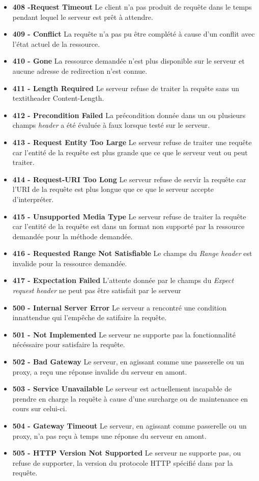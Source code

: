 \documentclass{scrreprt}
\begin{document}
\begin{itemize}
 \item \textbf{408 -Request Timeout}
 \subitem Le client n'a pas produit de requête dans le temps pendant lequel le serveur est prêt à attendre.
 \item \textbf{409 - Conflict}
 \subitem La requête n'a pas pu être complété à cause d'un conflit avec l'état actuel de la ressource.
 \item \textbf{410 - Gone}
 \subitem La ressource demandée n'est plus disponible sur le serveur et aucune adresse de redirection n'est connue.
 \item \textbf{411 - Length Required}
 \subitem Le serveur refuse de traiter la requête sans un textit{header} Content-Length.
 \item \textbf{412 - Precondition Failed}
 \subitem La précondition donnée dans un ou plusieurs champs \textit{header} a été évaluée à faux lorsque testé sur le serveur.
 \item \textbf{413 - Request Entity Too Large}
 \subitem Le serveur refuse de traiter une requête car l'entité de la requête est plus grande que ce que le serveur veut ou peut traiter.
 \item \textbf{414 - Request-URI Too Long}
 \subitem Le serveur refuse de servir la requête car l'URI de la requête est plus longue que ce que le serveur accepte d'interpréter.
 \item \textbf{415 - Unsupported Media Type}
 \subitem Le serveur refuse de traiter la requête car l'entité de la requête est dans un format non supporté par la ressource demandée pour la méthode demandée.
 \item \textbf{416 - Requested Range Not Satisfiable}
 \subitem Le champs du \textit{Range header} est invalide pour la ressource demandée.
 \item \textbf{417 - Expectation Failed}
 \subitem L'attente donnée par le champs du \textit{Expect request header} ne peut pas être satisfait par le serveur
 \item \textbf{500 - Internal Server Error}
 \subitem Le serveur a rencontré une condition innattendue qui l'empêche de satifaire la requête.
 \item \textbf{501 - Not Implemented}
 \subitem Le serveur ne supporte pas la fonctionnalité nécéssaire pour satisfaire la requête.
 \item \textbf{502 - Bad Gateway}
 \subitem Le serveur, en agissant comme une passerelle ou un proxy, a reçu une réponse invalide du serveur en amont.
 \item \textbf{503 - Service Unavailable}
 \subitem Le serveur est actuellement incapable de prendre en charge la requête à cause d'une surcharge ou de maintenance en cours sur celui-ci.
 \item \textbf{504 - Gateway Timeout}
 \subitem Le serveur, en agissant comme passerelle ou un proxy, n'a pas reçu à temps une réponse du serveur en amont.
 \item \textbf{505 - HTTP Version Not Supported}
 \subitem Le serveur ne supporte pas, ou refuse de supporter, la version du protocole HTTP spécifié dans par la requête.
 \end{itemize}
\end{document}

